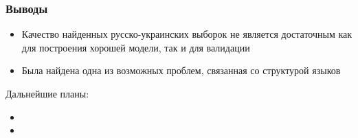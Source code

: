 \documentclass[10pt,pdf,hyperref={unicode}]{beamer}
\begin{document}
\begin{frame}
	
	\frametitle{Выводы}
	
	\begin{itemize}
		\item
			Качество найденных русско-украинских выборок не является достаточным как для построения хорошей модели, так и для валидации	
		\item
			Была найдена одна из возможных проблем, связанная со структурой языков
	\end{itemize}
	
	Дальнейшие планы:
	\begin{itemize}
		\item 
		
		\item 
	\end{itemize}
	
\end{frame}
\end{document}
